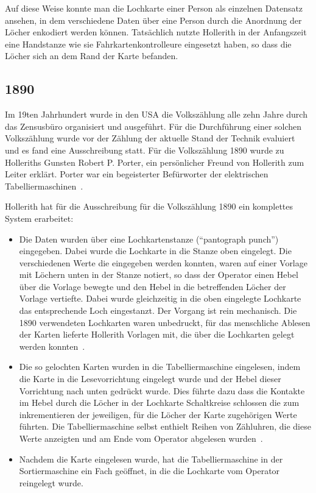 \documentclass[parskip=half]{scrartcl}
\begin{document}
Auf diese Weise konnte man die Lochkarte einer Person als einzelnen Datensatz
ansehen, in dem verschiedene Daten über eine Person durch die Anordnung der
Löcher enkodiert werden können. Tatsächlich nutzte Hollerith in der Anfangszeit
eine Handstanze wie sie Fahrkartenkontrolleure eingesetzt haben, so dass die
Löcher sich an dem Rand der Karte befanden.

\subsection{1890}
\label{sec:1890}

Im 19ten Jahrhundert wurde in den USA die Volkszählung alle zehn Jahre durch
das Zensusbüro organisiert und ausgeführt. Für die Durchführung einer solchen
Volkszählung wurde vor der Zählung der aktuelle Stand der Technik evaluiert und
es fand eine Ausschreibung statt. Für die Volkszählung 1890 wurde zu Holleriths
Gunsten Robert P. Porter, ein persönlicher Freund von Hollerith zum Leiter
erklärt. Porter war ein begeisterter Befürworter der elektrischen
Tabelliermaschinen~\cite{austrian1982herman}.

Hollerith hat für die Ausschreibung für die Volkszählung 1890 ein komplettes
System erarbeitet:

\begin{itemize}
  \item Die Daten wurden über eine Lochkartenstanze (\enquote{pantograph punch})
    eingegeben. Dabei wurde
    die Lochkarte in die Stanze oben eingelegt. Die verschiedenen Werte die
    eingegeben werden konnten, waren auf einer Vorlage mit Löchern unten in
    der Stanze notiert, so dass der Operator einen Hebel über die Vorlage
    bewegte und den Hebel in die betreffenden Löcher der Vorlage vertiefte.
    Dabei wurde gleichzeitig in die oben eingelegte Lochkarte das entsprechende
    Loch eingestanzt. Der Vorgang ist rein mechanisch. Die 1890 verwendeten
    Lochkarten waren unbedruckt, für das menschliche Ablesen der Karten
    lieferte Hollerith Vorlagen mit, die über die Lochkarten gelegt werden
    konnten~\cite{austrian1982herman}.
  \item Die so gelochten Karten wurden in die Tabelliermaschine eingelesen,
    indem die Karte in die Lesevorrichtung eingelegt wurde und der Hebel dieser
    Vorrichtung nach unten gedrückt wurde. Dies führte dazu dass die Kontakte
    im Hebel durch die Löcher in der Lochkarte Schaltkreise schlossen die zum
    inkrementieren der jeweiligen, für die Löcher der Karte zugehörigen Werte
    führten. Die Tabelliermaschine selbst enthielt Reihen von Zähluhren, die
    diese Werte anzeigten und am Ende vom Operator abgelesen
    wurden~\cite{deutschesMuseum}.
  \item Nachdem die Karte eingelesen wurde, hat die Tabelliermaschine in der
    Sortiermaschine ein Fach geöffnet, in die die Lochkarte vom Operator
    reingelegt wurde.
\end{itemize}
\end{document}
